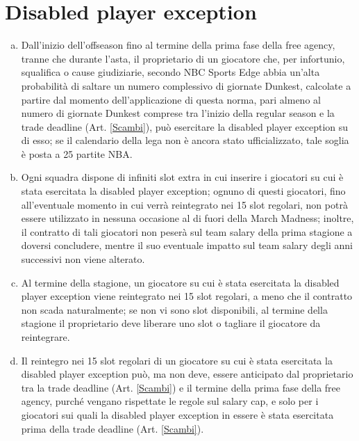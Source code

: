 \documentclass{article}
\begin{document}
\section{Disabled player exception}\label{Disabled player exception}
\begin{enumerate}[(a)]
\item Dall'inizio dell'offseason fino al termine della prima fase della free agency, tranne che durante l'asta, il proprietario di un giocatore che, per infortunio, squalifica o cause giudiziarie, secondo NBC Sports Edge abbia un'alta probabilità di saltare un numero complessivo di giornate Dunkest, calcolate a partire dal momento dell'applicazione di questa norma, pari almeno al numero di giornate Dunkest comprese tra l'inizio della regular season e la trade deadline (Art. \ref{Scambi}), può esercitare la disabled player exception su di esso; se il calendario della lega non è ancora stato ufficializzato, tale soglia è posta a 25 partite NBA.
\item Ogni squadra dispone di infiniti slot extra in cui inserire i giocatori su cui è stata esercitata la disabled player exception; ognuno di questi giocatori, fino all'eventuale momento in cui verrà reintegrato nei 15 slot regolari, non potrà essere utilizzato in nessuna occasione al di fuori della March Madness; inoltre, il contratto di tali giocatori non peserà sul team salary della prima stagione a doversi concludere, mentre il suo eventuale impatto sul team salary degli anni successivi non viene alterato.
\item Al termine della stagione, un giocatore su cui è stata esercitata la disabled player exception viene reintegrato nei 15 slot regolari, a meno che il contratto non scada naturalmente; se non vi sono slot disponibili, al termine della stagione il proprietario deve liberare uno slot o tagliare il giocatore da reintegrare.
\item Il reintegro nei 15 slot regolari di un giocatore su cui è stata esercitata la disabled player exception può, ma non deve, essere anticipato dal proprietario tra la trade deadline (Art. \ref{Scambi}) e il termine della prima fase della free agency, purché vengano rispettate le regole sul salary cap, e solo per i giocatori sui quali la disabled player exception in essere è stata esercitata prima della trade deadline (Art. \ref{Scambi}).
\end{enumerate}
\end{document}
